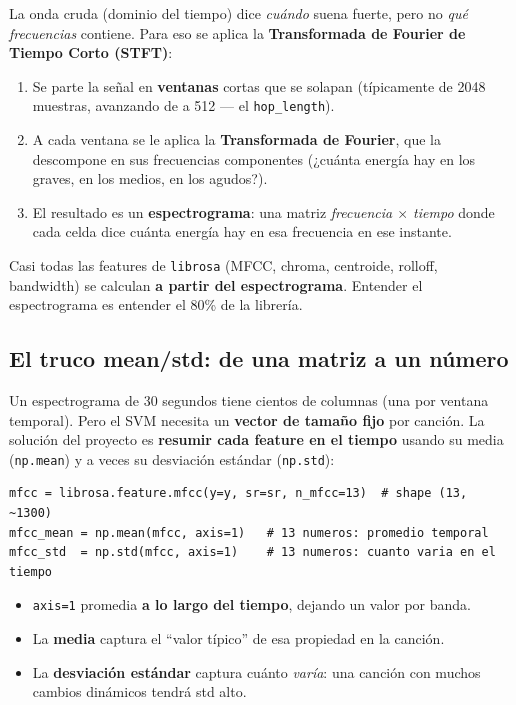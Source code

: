 \documentclass[11pt,a4paper]{article}
\newenvironment{ideabox}[1]{\begin{mdframed}[style=ideastyle,frametitle={#1}]}{\end{mdframed}}
\begin{document}
La onda cruda (dominio del tiempo) dice \emph{cuándo} suena fuerte, pero no
\emph{qué frecuencias} contiene. Para eso se aplica la
\textbf{Transformada de Fourier de Tiempo Corto (STFT)}:

\begin{enumerate}[leftmargin=0.8cm]
  \item Se parte la señal en \textbf{ventanas} cortas que se solapan
  (típicamente de 2048 muestras, avanzando de a 512 --- el \texttt{hop\_length}).
  \item A cada ventana se le aplica la \textbf{Transformada de Fourier}, que la
  descompone en sus frecuencias componentes (¿cuánta energía hay en los graves,
  en los medios, en los agudos?).
  \item El resultado es un \textbf{espectrograma}: una matriz
  \emph{frecuencia $\times$ tiempo} donde cada celda dice cuánta energía hay en
  esa frecuencia en ese instante.
\end{enumerate}

\begin{ideabox}{Idea central}
Casi todas las features de \texttt{librosa} (MFCC, chroma, centroide, rolloff,
bandwidth) se calculan \textbf{a partir del espectrograma}. Entender el
espectrograma es entender el 80\% de la librería.
\end{ideabox}

\subsection{El truco mean/std: de una matriz a un número}

Un espectrograma de 30 segundos tiene cientos de columnas (una por ventana
temporal). Pero el SVM necesita un \textbf{vector de tamaño fijo} por canción.
La solución del proyecto es \textbf{resumir cada feature en el tiempo} usando su
media (\texttt{np.mean}) y a veces su desviación estándar (\texttt{np.std}):

\begin{lstlisting}
mfcc = librosa.feature.mfcc(y=y, sr=sr, n_mfcc=13)  # shape (13, ~1300)
mfcc_mean = np.mean(mfcc, axis=1)   # 13 numeros: promedio temporal
mfcc_std  = np.std(mfcc, axis=1)    # 13 numeros: cuanto varia en el tiempo
\end{lstlisting}

\begin{itemize}[leftmargin=0.7cm]
  \item \texttt{axis=1} promedia \textbf{a lo largo del tiempo}, dejando un valor
  por banda.
  \item La \textbf{media} captura el ``valor típico'' de esa propiedad en la
  canción.
  \item La \textbf{desviación estándar} captura cuánto \emph{varía}: una canción
  con muchos cambios dinámicos tendrá std alto.
\end{itemize}
\end{document}
